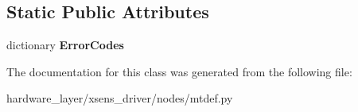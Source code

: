 \subsection*{Static Public Attributes}
\begin{DoxyCompactItemize}
\item 
\mbox{\label{classmtdef_1_1MTErrorMessage_a5bf79428ba751963956daa0258b277c4}} 
dictionary {\bfseries Error\+Codes}
\end{DoxyCompactItemize}


The documentation for this class was generated from the following file\+:\begin{DoxyCompactItemize}
\item 
hardware\+\_\+layer/xsens\+\_\+driver/nodes/mtdef.\+py\end{DoxyCompactItemize}
